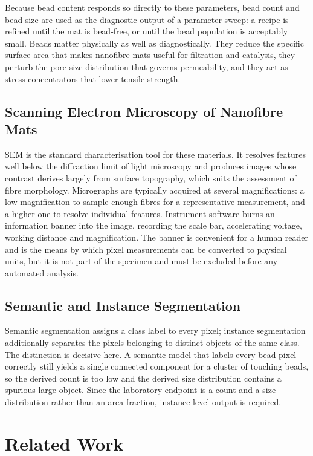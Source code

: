 Because bead content responds so directly to these parameters, bead count and bead
size are used as the diagnostic output of a parameter sweep: a recipe is refined
until the mat is bead-free, or until the bead population is acceptably small.
Beads matter physically as well as diagnostically. They reduce the specific surface
area that makes nanofibre mats useful for filtration and catalysis, they perturb the
pore-size distribution that governs permeability, and they act as stress
concentrators that lower tensile strength.

\subsection{Scanning Electron Microscopy of Nanofibre Mats}

SEM is the standard characterisation tool for these materials. It resolves features
well below the diffraction limit of light microscopy and produces images whose
contrast derives largely from surface topography, which suits the assessment of
fibre morphology. Micrographs are typically acquired at several magnifications: a
low magnification to sample enough fibres for a representative measurement, and a
higher one to resolve individual features. Instrument software burns an information
banner into the image, recording the scale bar, accelerating voltage, working
distance and magnification. The banner is convenient for a human reader and is the
means by which pixel measurements can be converted to physical units, but it is not
part of the specimen and must be excluded before any automated analysis.

\subsection{Semantic and Instance Segmentation}

Semantic segmentation assigns a class label to every pixel; instance segmentation
additionally separates the pixels belonging to distinct objects of the same class.
The distinction is decisive here. A semantic model that labels every bead pixel
correctly still yields a single connected component for a cluster of touching
beads, so the derived count is too low and the derived size distribution contains a
spurious large object. Since the laboratory endpoint is a count and a size
distribution rather than an area fraction, instance-level output is required.

\section{Related Work}

